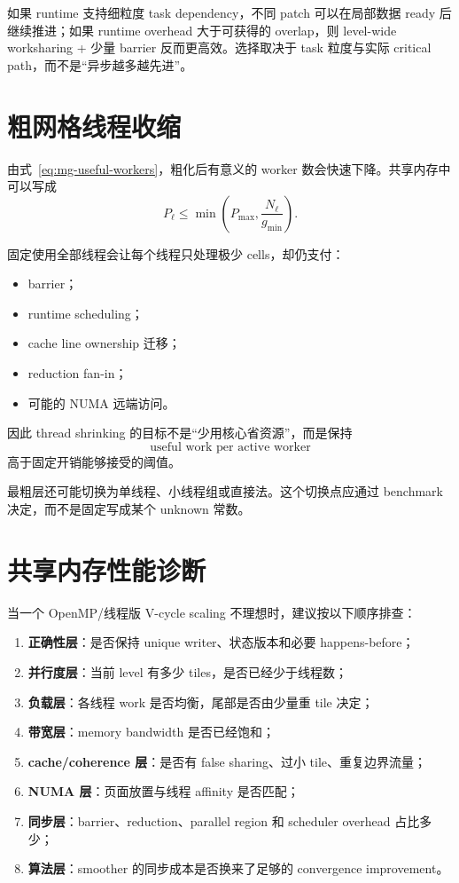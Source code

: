 如果 runtime 支持细粒度 task dependency，不同 patch 可以在局部数据 ready 后继续推进；如果 runtime overhead 大于可获得的 overlap，则 level-wide worksharing + 少量 barrier 反而更高效。选择取决于 task 粒度与实际 critical path，而不是“异步越多越先进”。

\section{粗网格线程收缩}

由式~\eqref{eq:mg-useful-workers}，粗化后有意义的 worker 数会快速下降。共享内存中可以写成
\begin{equation}
P_\ell
\le
\min
\left(
P_{\max},
\frac{N_\ell}{g_{\min}}
\right).
\label{eq:shared-thread-shrinking}
\end{equation}

固定使用全部线程会让每个线程只处理极少 cells，却仍支付：
\begin{itemize}
\item barrier；
\item runtime scheduling；
\item cache line ownership 迁移；
\item reduction fan-in；
\item 可能的 NUMA 远端访问。
\end{itemize}

因此 thread shrinking 的目标不是“少用核心省资源”，而是保持
\begin{equation}
\boxed{
\text{useful work per active worker}
}
\end{equation}
高于固定开销能够接受的阈值。

最粗层还可能切换为单线程、小线程组或直接法。这个切换点应通过 benchmark 决定，而不是固定写成某个 unknown 常数。

\section{共享内存性能诊断}

当一个 OpenMP/线程版 V-cycle scaling 不理想时，建议按以下顺序排查：

\begin{enumerate}
\item \textbf{正确性层}：是否保持 unique writer、状态版本和必要 happens-before；
\item \textbf{并行度层}：当前 level 有多少 tiles，是否已经少于线程数；
\item \textbf{负载层}：各线程 work 是否均衡，尾部是否由少量重 tile 决定；
\item \textbf{带宽层}：memory bandwidth 是否已经饱和；
\item \textbf{cache/coherence 层}：是否有 false sharing、过小 tile、重复边界流量；
\item \textbf{NUMA 层}：页面放置与线程 affinity 是否匹配；
\item \textbf{同步层}：barrier、reduction、parallel region 和 scheduler overhead 占比多少；
\item \textbf{算法层}：smoother 的同步成本是否换来了足够的 convergence improvement。
\end{enumerate}

